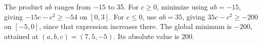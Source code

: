 The product $ab$ ranges from $-15$ to 35. For $c\ge0$, minimize using $ab=-15$, giving $-15c-c^2\ge-54$ on $[0,3]$. For $c\le0$, use $ab=35$, giving $35c-c^2\ge-200$ on $[-5,0]$, since that expression increases there. The global minimum is $-200$, attained at $(a,b,c)=(7,5,-5)$. Its absolute value is $\boxed{200}$.
